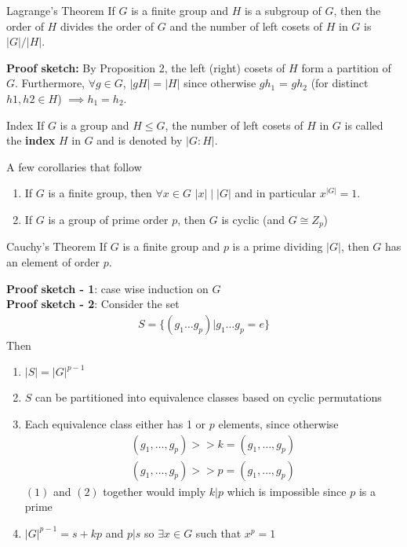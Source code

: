\documentclass[titlepage, 12pt]{article}
\begin{document}
\begin{theorem}{Lagrange's Theorem}{}
    If $G$ is a finite group and $H$ is a subgroup of $G$, then the order of $H$
    divides the order of $G$ and the number of left cosets of $H$ in $G$ is
    $|G|/|H|$.
\end{theorem}
\textbf{Proof sketch:} By Proposition 2, the left (right) cosets of $H$ form a
partition of $G$. Furthermore, $\forall g\in G$, $|gH| = |H|$ since otherwise
$gh_1$ = $gh_2$ (for distinct $h1, h2\in H$) $\implies h_1 = h_2$.
\begin{definition}{Index}{}
    If $G$ is a group and $H\le G$, the number of left cosets of $H$ in $G$ is
    called the \textbf{index} $H$ in $G$ and is denoted by $|G:H|$.
\end{definition}
A few corollaries that follow
\begin{enumerate}
    \item If $G$ is a finite group, then $\forall x\in G$ $|x|\mid |G|$ and in
        particular $x^{|G|} = 1$.
    \item If $G$ is a group of prime order $p$, then $G$ is cyclic (and $G\cong
        Z_p$)
\end{enumerate}
\begin{theorem}{Cauchy's Theorem}{}
    If $G$ is a finite group and $p$ is a prime dividing $|G|$, then $G$ has an
    element of order $p$.
\end{theorem}
\textbf{Proof sketch - 1}: case wise induction on $G$\\
\textbf{Proof sketch - 2}: Consider the set
\begin{gather*}
    S = \{(g_1\dots g_p) | g_1\dots g_p = e\}
\end{gather*}
Then
\begin{enumerate}
    \item $|S| = |G|^{p-1}$
    \item $S$ can be partitioned into equivalence classes based on cyclic
        permutations
    \item Each equivalence class either has 1 or $p$ elements, since otherwise
        \begin{gather}
            (g_1,\dots,g_p)>>k = (g_1,\dots,g_p)\\
            (g_1,\dots,g_p)>>p = (g_1,\dots,g_p)
        \end{gather}
        $(1)$ and $(2)$ together would imply $k|p$ which is impossible since $p$
        is a prime
    \item $|G|^{p-1} = s + kp$ and $p|s$ so $\exists x\in G$ such that $x^p = 1$
\end{enumerate}
\end{document}
